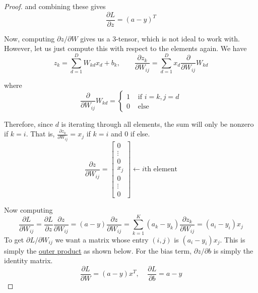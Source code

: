 \begin{proof}
    and combining these gives 
    \begin{equation}
      \frac{\partial L}{\partial z} = (a - y)^T
    \end{equation}
   
    Now, computing $\partial z / \partial W$ gives us a $3$-tensor, which is not ideal to work with. However, let us just compute this with respect to the elements again. We have 
    \begin{equation}
      z_k = \sum_{d=1}^D W_{kd} x_d + b_k, \qquad \frac{\partial z_k}{\partial W_{ij}} = \sum_{d=1}^D x_d \frac{\partial}{\partial W_{ij}} W_{kd}
    \end{equation}
   
    where 
    \begin{equation}
      \frac{\partial}{\partial W_{ij}} W_{kd} = \begin{cases} 
        1 & \text{ if } i = k, j = d \\ 
        0 & \text{ else} 
      \end{cases}
    \end{equation}
   
    Therefore, since $d$ is iterating through all elements, the sum will only be nonzero if $k = i$. That is, $\frac{\partial z_k}{\partial W_{ij}} = x_j$ if $k = i$ and $0$ if else. 
    \begin{equation}
      \frac{\partial z}{\partial W_{ij}} = \begin{bmatrix}
      0 \\
      \vdots \\
      0 \\
      x_j \\
      0 \\
      \vdots \\
      0
      \end{bmatrix} \leftarrow i\text{th element} 
    \end{equation}
   
    Now computing 
    \begin{equation}
      \frac{\partial L}{\partial W_{ij}} = \frac{\partial L}{\partial z} \frac{\partial z}{\partial W_{ij}} = (a - y) \frac{\partial z}{\partial W_{ij}} = \sum_{k=1}^K (a_k - y_k) \frac{\partial z_k}{\partial W_{ij}} = (a_i - y_i) x_j
    \end{equation}
    To get $\partial L / \partial W_{ij}$ we want a matrix whose entry $(i, j)$ is $(a_i - y_i) x_j$. This is simply the \hyperref[lin-def:outer-product]{outer product} as shown below. For the bias term, $\partial z / \partial b$ is simply the identity matrix. 
    \begin{equation}
      \frac{\partial L}{\partial W} = (a - y) x^T, \;\;\;\; \frac{\partial L}{\partial b} = a - y
    \end{equation}
   

\end{proof}
